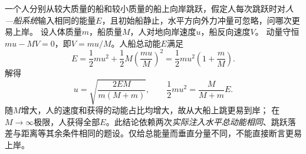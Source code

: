\problemtext 一个人分别从较大质量的船和较小质量的船上向岸跳跃，假定人每次跳跃时对\emph{人—船系统}输入相同的能量$E$，且初始船静止，水平方向外力冲量可忽略，问哪次更易上岸。
\workings
设人体质量$m$，船质量$M$，人对地向岸速度$u$，船反向速度$V$。
动量守恒$mu-MV=0$，即$V=mu/M$。人船总动能$E$满足
\[
E=\frac12mu^2+\frac12M\left(\frac{mu}{M}\right)^2
=\frac12mu^2\left(1+\frac mM\right).
\]
解得
\[
\boxed{u=\sqrt{\frac{2EM}{m(M+m)}}},\qquad
\frac12mu^2=\frac{M}{M+m}E.
\]
\crosscheck 随$M$增大，人的速度和获得的动能占比均增大，故从大船上跳更易到岸；
在$M\to\infty$极限，人获得全部$E$。此结论依赖两次\emph{实际注入水平总动能相同}、跳跃落差与距离等其余条件相同的题设。仅给总能量而垂直分量不同，不能直接断言更易上岸。
